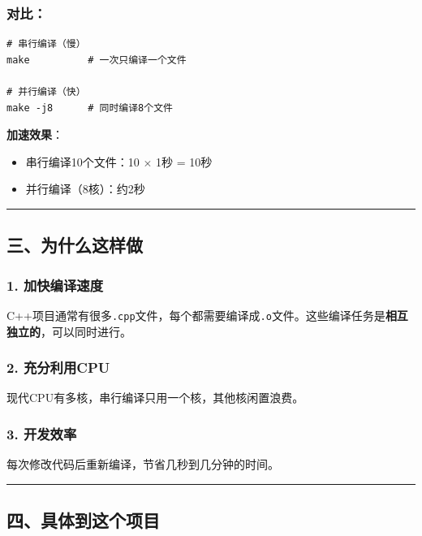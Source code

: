 \documentclass[11pt, a4paper]{article}
\begin{document}
\begin{aibox}
\subsubsection*{对比：}

\begin{tcolorbox}[colback=white,colframe=gray!50!white,boxrule=0.5pt,arc=2pt,left=5pt,right=5pt,top=5pt,bottom=5pt]
\begin{verbatim}
# 串行编译（慢）
make          # 一次只编译一个文件

# 并行编译（快）
make -j8      # 同时编译8个文件
\end{verbatim}
\end{tcolorbox}

\textbf{加速效果}：
\begin{itemize}
    \item 串行编译10个文件：10 $\times$ 1秒 = 10秒
    \item 并行编译（8核）：约2秒
\end{itemize}

\begin{center}\rule{\textwidth}{0.4pt}\end{center}

\subsection*{三、为什么这样做}

\subsubsection*{1. 加快编译速度}
C++项目通常有很多\texttt{.cpp}文件，每个都需要编译成\texttt{.o}文件。这些编译任务是\textbf{相互独立的}，可以同时进行。

\subsubsection*{2. 充分利用CPU}
现代CPU有多核，串行编译只用一个核，其他核闲置浪费。

\subsubsection*{3. 开发效率}
每次修改代码后重新编译，节省几秒到几分钟的时间。

\begin{center}\rule{\textwidth}{0.4pt}\end{center}

\subsection*{四、具体到这个项目}


\end{aibox}
\end{document}
